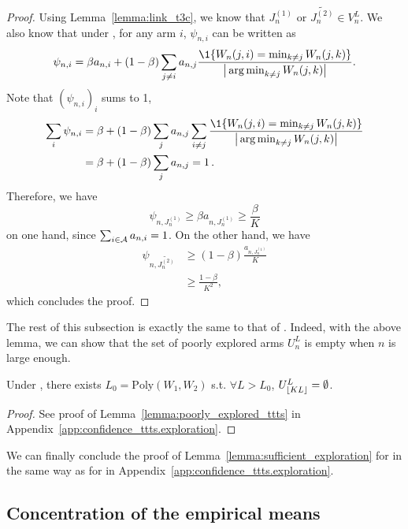\begin{proof}
    Using Lemma~\ref{lemma:link_t3c}, we know that $J_n^{(1)}$ or $\tilde{J_n^{(2)}} \in V_n^L$. We also know that under \TCC, for any arm $i$, $\psi_{n,i}$ can be written as
    \[
        \psi_{n,i} = \beta a_{n,i} + (1-\beta) \sum_{j\neq i} a_{n,j}\frac{\1\{W_n(j,i)=\min_{k\neq j} W_n(j,k)\}}{\big|\argmin_{k\neq j } W_n(j,k)\big|}.
    \]
    Note that $(\psi_{n,i})_i$ sums to 1,
    \begin{align*}
        \sum_i  \psi_{n,i} &= \beta +(1-\beta) \sum_j a_{n,j} \sum_{i\neq j } \frac{\1\{W_n(j,i)=\min_{k\neq j} W_n(j,k)\}}{\big|\argmin_{k\neq j } W_n(j,k)\big|}\\
        &= \beta +(1-\beta) \sum_j a_{n,j} =1\,.
    \end{align*}
    Therefore, we have
    \[
        \psi_{n,J_n^{(1)}} \geq \beta a_{n,J_n^{(1)}} \geq \frac{\beta}{K}
    \]
    on one hand, since $\sum_{i\in\mathcal{A}} a_{n,i} = 1$. On the other hand, we have
    \begin{align*}
        \psi_{n,\tilde{J_n^{(2)}}} &\geq (1-\beta) \frac{a_{n,J_n^{(1)}}}{K}\\
                           &\geq \frac{1-\beta}{K^2},
    \end{align*}
    which concludes the proof.
\end{proof}

The rest of this subsection is exactly the same to that of \TTTS. Indeed, with the above lemma, we can show that the set of poorly explored arms $U_n^L$ is empty when $n$ is large enough.

\begin{lemma}\label{lemma:poorly_explored_t3c}
\begin{leftbar}[lemmabar]
    Under \TCC, there exists $L_0 = \text{Poly}(W_1,W_2)$ s.t. $\forall L > L_0$, $U_{\lfloor KL\rfloor}^L = \emptyset$.
\end{leftbar}
\end{lemma}

\begin{proof}
    See proof of Lemma~\ref{lemma:poorly_explored_ttts} in Appendix~\ref{app:confidence_ttts.exploration}.
\end{proof}

We can finally conclude the proof of Lemma~\ref{lemma:sufficient_exploration} for \TCC in the same way as for \TTTS in Appendix~\ref{app:confidence_ttts.exploration}.
\hfill\BlackBox\\[2mm]

\subsection{Concentration of the empirical means}\label{app:confidence_t3c.means}

